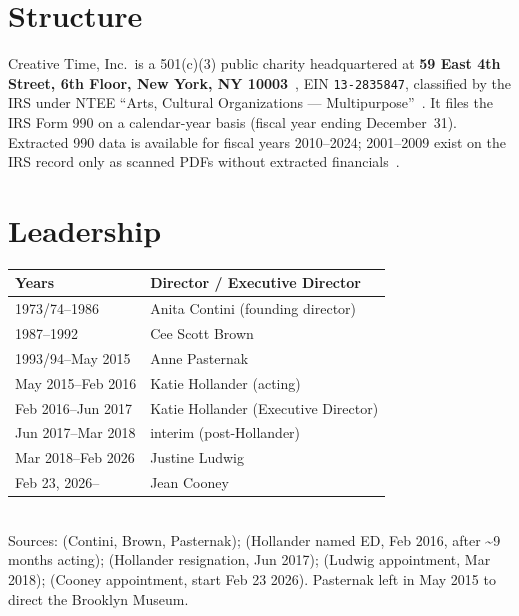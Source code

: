 \documentclass[10pt,letterpaper,twocolumn]{article}
\begin{document}
\section{Structure}

Creative Time, Inc.\ is a 501(c)(3) public charity headquartered at \textbf{59 East 4th Street, 6th Floor, New York, NY 10003}~\citep{ctabout}, EIN \texttt{13-2835847}, classified by the IRS under NTEE ``Arts, Cultural Organizations --- Multipurpose''~\citep{ctpropublica}. It files the IRS Form 990 on a calendar-year basis (fiscal year ending December~31). Extracted 990 data is available for fiscal years 2010--2024; 2001--2009 exist on the IRS record only as scanned PDFs without extracted financials~\citep{ctpropublica}.

\section{Leadership}

\begin{table}[h]
\footnotesize
\centering
\setlength{\tabcolsep}{3pt}
\begin{tabularx}{\columnwidth}{lX}
\toprule
\textbf{Years} & \textbf{Director / Executive Director} \\
\midrule
1973/74--1986 & Anita Contini (founding director) \\
1987--1992 & Cee Scott Brown \\
1993/94--May 2015 & Anne Pasternak \\
May 2015--Feb 2016 & Katie Hollander (acting) \\
Feb 2016--Jun 2017 & Katie Hollander (Executive Director) \\
Jun 2017--Mar 2018 & interim (post-Hollander) \\
Mar 2018--Feb 2026 & Justine Ludwig \\
Feb 23, 2026-- & Jean Cooney \\
\bottomrule
\end{tabularx}
\\[0.3em]
\footnotesize Sources: \citet{ctfales,ctwiki} (Contini, Brown, Pasternak); \citet{cthollander2016} (Hollander named ED, Feb 2016, after \textasciitilde9 months acting); \citet{cthollander2017} (Hollander resignation, Jun 2017); \citet{ctludwig2018} (Ludwig appointment, Mar 2018); \citet{ctcooney2026} (Cooney appointment, start Feb 23 2026). Pasternak left in May 2015 to direct the Brooklyn Museum.
\end{table}
\end{document}

